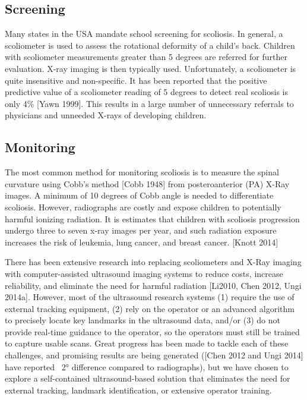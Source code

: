 \documentclass{article}
\begin{document}
\subsection{Screening}
\label{ssec:screen}
Many states in the USA mandate school screening for scoliosis. In general, a scoliometer is used to assess the rotational deformity of a child’s back. Children with scoliometer measurements greater than 5 degrees are referred for further evaluation. X-ray imaging is then typically used. Unfortunately, a scoliometer is quite insensitive and non-specific. It has been reported that the positive predictive value of a scoliometer reading of 5 degrees to detect real scoliosis is only 4\% [Yawn 1999]. This results in a large number of unnecessary referrals to physicians and unneeded X-rays of developing children.

\subsection{Monitoring}
\label{ssec:Monitoring}
 The most common method for monitoring scoliosis is to measure the spinal curvature using Cobb's method [Cobb 1948] from posteroanterior (PA) X-Ray images. A minimum of 10 degrees of Cobb angle is needed to differentiate scoliosis.  However, radiographs are costly and expose children to potentially harmful ionizing radiation. It is estimates that children with scoliosis progression undergo three to seven x-ray images per year, and such radiation exposure increases the risk of leukemia, lung cancer, and breast cancer. [Knott 2014]
 
There has been extensive research into replacing scoliometers and X-Ray imaging with computer-assisted ultrasound imaging systems to reduce costs, increase reliability, and eliminate the need for harmful radiation [Li2010, Chen 2012, Ungi 2014a].  However, most of the ultrasound research systems (1) require the use of external tracking equipment, (2) rely on the operator or an advanced algorithm to precisely locate key landmarks in the ultrasound data, and/or (3) do not provide real-time guidance to the operator, so the operators must still be trained to capture usable scans.  Great progress has been made to tackle each of these challenges, and promising results are being generated ([Chen 2012 and Ungi 2014] have reported ~2° difference compared to radiographs), but we have chosen to explore a self-contained ultrasound-based solution that eliminates the need for external tracking, landmark identification, or extensive operator training.
\end{document}
